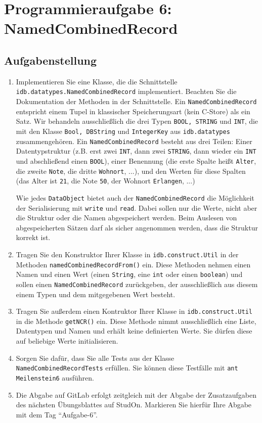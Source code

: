 \section{Programmieraufgabe 6: NamedCombinedRecord}

\subsection{Aufgabenstellung}
\begin{enumerate}
	\item Implementieren Sie eine Klasse, die die Schnittstelle \beamertxt{\linebreak}\texttt{idb.datatypes.NamedCombinedRecord} implementiert.
		Beachten Sie die Dokumentation der Methoden in der Schnittstelle.
		Ein \texttt{NamedCombinedRecord} entspricht einem Tupel in klassischer Speicherungsart (kein C-Store) als ein Satz.
		Wir behandeln ausschließlich die drei Typen \texttt{BOOL, STRING} und \texttt{INT}, die mit den Klasse \texttt{Bool, DBString} und \texttt{IntegerKey} aus \texttt{idb.datatypes} zusammengehören.
		Ein \texttt{NamedCombinedRecord} besteht aus drei Teilen: Einer Datentypstruktur (z.B. erst zwei \texttt{INT}, dann zwei \texttt{STRING}, dann wieder ein \texttt{INT} und abschließend einen \texttt{BOOL}), einer Benennung (die erste Spalte heißt \texttt{Alter}, die zweite \texttt{Note}, die dritte \texttt{Wohnort}, ...),
		und den Werten für diese Spalten (das Alter ist \texttt{21}, die Note \texttt{50}, der Wohnort \texttt{Erlangen}, ...)

		Wie jedes \texttt{DataObject} bietet auch der \texttt{NamedCombinedRecord} die Möglichkeit der Serialisierung mit \texttt{write} und \texttt{read}.
		Dabei sollen nur die Werte, nicht aber die Struktur oder die Namen abgespeichert werden.
		Beim Auslesen von abgespeicherten Sätzen darf als sicher angenommen werden, dass die Struktur korrekt ist.
	\item Tragen Sie den Konstruktor Ihrer Klasse in \texttt{idb.construct.Util} in der Methoden \texttt{namedCombinedRecordFrom()} ein.
		Diese Methoden nehmen einen Namen und einen Wert (einen \texttt{String}, eine \texttt{int} oder einen \texttt{boolean}) und sollen einen \texttt{NamedCombinedRecord} zurückgeben, der ausschließlich aus diesem einem Typen und dem mitgegebenen Wert besteht.
	\item Tragen Sie außerdem einen Kontruktor Ihrer Klasse in \texttt{idb.construct.Util} in die Methode \texttt{getNCR()} ein.
		Diese Methode nimmt ausschließlich eine Liste, Datentypen und Namen und erhält keine definierten Werte. Sie dürfen diese auf beliebige Werte initialisieren.
	\item Sorgen Sie dafür, dass Sie alle Tests aus der Klasse \texttt{NamedCombinedRecordTests} erfüllen.
	Sie können diese Testfälle mit \lstinline|ant Meilenstein6| ausführen.
	\item Die Abgabe auf GitLab erfolgt zeitgleich mit der Abgabe der Zusatzaufgaben des nächsten Übungsblattes auf StudOn. Markieren Sie hierfür Ihre Abgabe mit dem Tag "`Aufgabe-6"'.
\end{enumerate}


